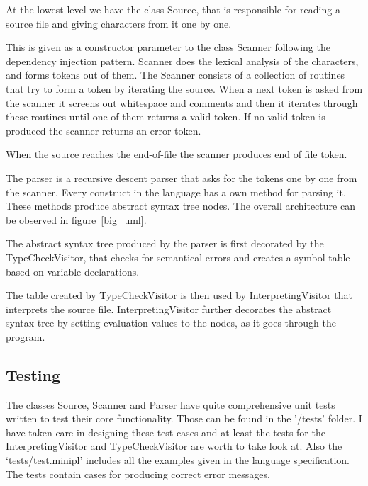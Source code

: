 \documentclass[12pt,a4paper]{article}
\begin{document}
At the lowest level we have the class Source, that is responsible
for reading a source file and giving characters from it one by one.

This is given as a constructor parameter to the class Scanner following
the dependency injection pattern. Scanner
does the lexical analysis of the characters, and forms tokens out
of them. The Scanner consists of a collection of routines that
try to form a token by iterating the source. When a next
token is asked from the scanner it screens out whitespace and
comments and then it iterates through these
routines until one of them returns a valid token. If no
valid token is produced the scanner returns an error token.

When the source reaches the end-of-file the scanner produces
end of file token.

The parser is a recursive descent parser that asks for the tokens
one by one from the scanner. Every construct in the language has
a own method for parsing it. These methods produce abstract syntax 
tree nodes. The overall architecture can be observed in figure~\ref{big_uml}.

The abstract syntax tree produced by the parser
is first decorated by the TypeCheckVisitor, that
checks for semantical errors and creates a symbol table
based on variable declarations.

The table created by TypeCheckVisitor is then used by
InterpretingVisitor that interprets the source file.
InterpretingVisitor further decorates the abstract 
syntax tree by setting evaluation values to the nodes,
as it goes through the program.



\subsection{Testing}

The classes Source, Scanner and Parser have quite comprehensive
unit tests written to test their core functionality. Those
can be found in the '/tests' folder. I have taken care in 
designing these test cases and at least the tests for the
InterpretingVisitor and TypeCheckVisitor are worth to 
take look at.
Also the `tests/test.minipl' includes all the examples given
in the language specification.
The tests contain cases for producing correct error messages.
\end{document}
